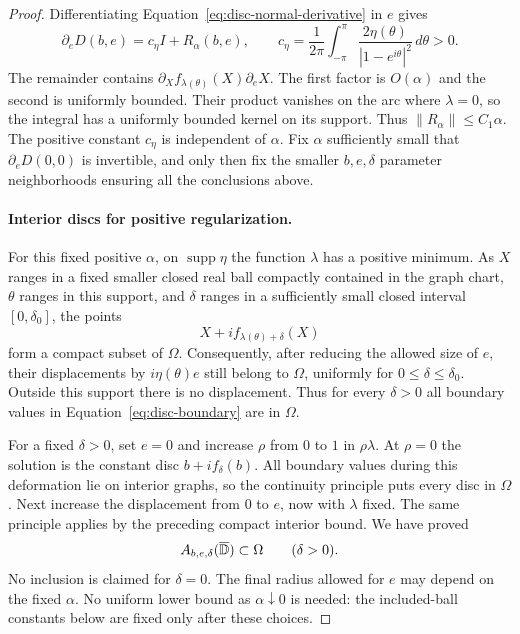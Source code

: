 \begin{proof}
Differentiating Equation~\eqref{eq:disc-normal-derivative} in $e$ gives
\[
 \partial_e D(b,e)=c_\eta I+R_\alpha(b,e),
 \qquad
 c_\eta=\frac{1}{2\pi}\int_{-\pi}^{\pi}
       \frac{2\eta(\theta)}{|1-e^{i\theta}|^2}\,d\theta>0.
\]
The remainder contains $\partial_X f_{\lambda(\theta)}(X)\partial_e X$.
The first factor is $O(\alpha)$ and the second is uniformly bounded.
Their product vanishes on the arc where $\lambda=0$, so the integral
has a uniformly bounded kernel on its support.  Thus
$\|R_\alpha\|\le C_1\alpha$.  The positive constant $c_\eta$ is
independent of $\alpha$.  Fix $\alpha$ sufficiently small that
$\partial_e D(0,0)$ is invertible, and only then fix the smaller
$b,e,\delta$ parameter neighborhoods ensuring all the conclusions above.

\paragraph{Interior discs for positive regularization.}
For this fixed positive $\alpha$, on $\operatorname{supp}\eta$
the function $\lambda$ has a positive minimum.  As $X$ ranges in a
fixed smaller closed real ball compactly contained in the graph chart,
$\theta$ ranges in this support, and $\delta$
ranges in a sufficiently small closed interval $[0,\delta_0]$, the
points
\[
 X+i f_{\lambda(\theta)+\delta}(X)
\]
form a compact subset of $\Omega$.  Consequently, after reducing the
allowed size of $e$, their displacements by $i\eta(\theta)e$ still
belong to $\Omega$, uniformly for $0\le\delta\le\delta_0$.
Outside this support there is no displacement.  Thus for every
$\delta>0$ all boundary values in Equation~\eqref{eq:disc-boundary}
are in $\Omega$.

For a fixed $\delta>0$, set $e=0$ and increase $\rho$ from $0$ to $1$
in $\rho\lambda$.  At $\rho=0$ the solution is the constant disc
$b+i f_\delta(b)$.  All boundary values during this deformation lie
on interior graphs, so the continuity principle puts every disc in
$\Omega$.  Next increase the displacement from $0$ to $e$, now with
$\lambda$ fixed.  The same principle applies by the preceding compact
interior bound.  We have proved
\begin{equation}\label{eq:positive-discs}
 A_{b,e,\delta}(\overline{\mathbb D})\subset\Omega
 \qquad(\delta>0).
\end{equation}
No inclusion is claimed for $\delta=0$.
The final radius allowed for $e$ may depend on the fixed $\alpha$.
No uniform lower bound as $\alpha\downarrow0$ is needed: the included-ball
constants below are fixed only after these choices.


\end{proof}

